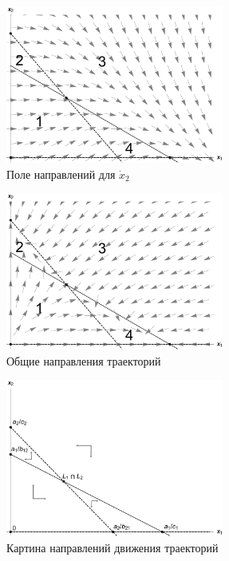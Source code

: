 \documentclass[12pt,a4paper]{article}
\begin{document}
    \pagebreak

    \begin{figure}[h]
        \centering
        \includegraphics[width=0.64\textwidth]{dirFields_22.pdf}
        \caption{Поле направлений для $ \dot x_2 $}
        \label{fig:dirFields_22}
    \end{figure}
    
    \begin{figure}[h]
        \centering
        \includegraphics[width=0.64\textwidth]{areas_2.pdf}
        \caption{Общие направления траекторий}
        \label{fig:areas_2}
    \end{figure}

    \pagebreak

    \begin{figure}[h]
        \centering
        \includegraphics[width=0.64\textwidth]{areas_2*.pdf}
        \caption{Картина направлений движения траекторий}
        \label{fig:areas_2*}
    \end{figure}
    
\end{document}
